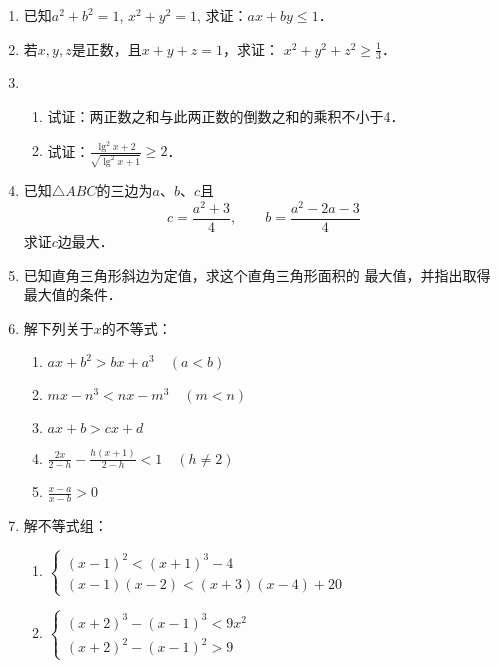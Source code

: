 \begin{enumerate}
\item 已知$a^2+b^2=1$, $x^2+y^2=1$, 求证：$ax+by\le 1$．
\item 若$x,y,z$是正数，且$x+y+z=1$，求证：
$x^2+y^2+z^2\ge \frac{1}{3}$．
\item \begin{enumerate}
    \item 试证：两正数之和与此两正数的倒数之和的乘积不小于4．
    \item 试证：$\frac{\lg^2x+2}{\sqrt{\lg^2x+1}}\ge 2$．
\end{enumerate}
\item 已知$\triangle ABC$的三边为$a$、$b$、$c$且
\[c=\frac{a^2+3}{4},\qquad b=\frac{a^2-2a-3}{4}\]
求证$c$边最大．
\item 
已知直角三角形斜边为定值，求这个直角三角形面积的
最大值，并指出取得最大值的条件．
\item 
解下列关于$x$的不等式：
\begin{multicols}{2}
\begin{enumerate}
    \item $ax+b^2>bx+a^3\quad (a<b)$
    \item $mx-n^3<nx-m^3\quad (m<n)$
    \item $ax+b>cx+d$
    \item $\frac{2x}{2-h}-\frac{h(x+1)}{2-h}<1\quad (h\ne 2)$
    \item $\frac{x-a}{x-b}>0$
\end{enumerate}
\end{multicols}
\item 解不等式组：
\begin{enumerate}
    \item $\begin{cases}
        (x-1)^2<(x+1)^3-4\\(x-1)(x-2)<(x+3)(x-4)+20
    \end{cases}$
    \item $\begin{cases}
        (x+2)^3-(x-1)^3<9x^2 \\(x+2)^2-(x-1)^2>9
    \end{cases}$
\end{enumerate}


\end{enumerate}
